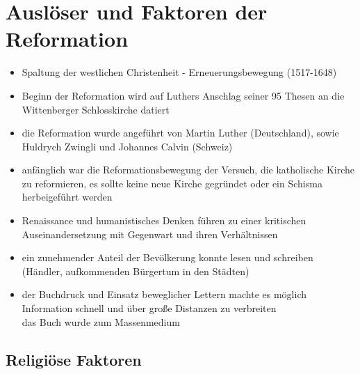 \documentclass[11pt,a4paper]{article}
\begin{document}
\section*{\textsf{Auslöser und Faktoren der Reformation}}

\begin{itemize}
\item Spaltung der westlichen Christenheit - Erneuerungsbewegung (1517-1648)
\item Beginn der Reformation wird auf Luthers Anschlag seiner 95 Thesen an die Wittenberger Schlosskirche datiert
\item die Reformation wurde angeführt von Martin Luther (Deutschland), sowie Huldrych Zwingli und Johannes Calvin (Schweiz)
\item anfänglich war die Reformationsbewegung der Versuch, die katholische Kirche zu reformieren, es sollte keine neue Kirche gegründet oder ein Schisma herbeigeführt werden


\item Renaissance und humanistisches Denken führen zu einer kritischen Auseinandersetzung mit Gegenwart und ihren Verhältnissen
\item ein zunehmender Anteil der Bevölkerung konnte lesen und schreiben (Händler, aufkommenden Bürgertum in den Städten)
\item der Buchdruck und Einsatz beweglicher Lettern machte es möglich Information schnell und über große Distanzen zu verbreiten\\
	 das Buch wurde zum Massenmedium\\


\end{itemize}


\subsection*{\textsf{Religiöse Faktoren}}
\end{document}
